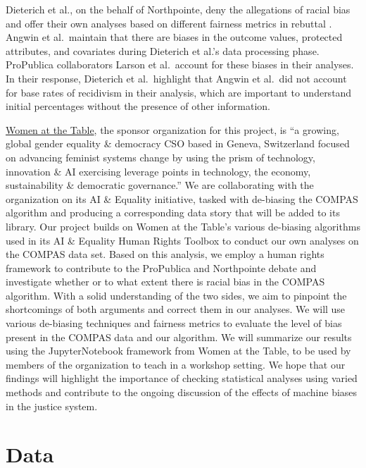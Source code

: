 \documentclass[water,article,submit,moreauthors,pdftex]{mdpi}
\begin{document}
Dieterich et al., on the behalf of Northpointe, deny the allegations of
racial bias and offer their own analyses based on different fairness
metrics in rebuttal \citep{equivant_response_2016}. Angwin et
al.~maintain that there are biases in the outcome values, protected
attributes, and covariates during Dieterich et al.'s data processing
phase. ProPublica collaborators Larson et al.~account for these biases
in their analyses. In their response, Dieterich et al.~highlight that
Angwin et al.~did not account for base rates of recidivism in their
analysis, which are important to understand initial percentages without
the presence of other information.

\href{https://www.womenatthetable.net/}{Women at the Table}, the sponsor
organization for this project, is ``a growing, global gender equality \&
democracy CSO based in Geneva, Switzerland focused on advancing feminist
systems change by using the prism of technology, innovation \& AI
exercising leverage points in technology, the economy, sustainability \&
democratic governance.'' We are collaborating with the organization on
its AI \& Equality \citep{noauthor_ai_nodate} initiative, tasked with
de-biasing the COMPAS algorithm \citep{aif360-oct-2018} and producing a
corresponding data story that will be added to its library. Our project
builds on Women at the Table's various de-biasing algorithms used in its
AI \& Equality Human Rights Toolbox to conduct our own analyses on the
COMPAS data set. Based on this analysis, we employ a human rights
framework to contribute to the ProPublica and Northpointe debate and
investigate whether or to what extent there is racial bias in the COMPAS
algorithm. With a solid understanding of the two sides, we aim to
pinpoint the shortcomings of both arguments and correct them in our
analyses. We will use various de-biasing techniques and fairness metrics
to evaluate the level of bias present in the COMPAS data and our
algorithm. We will summarize our results using the JupyterNotebook
framework from Women at the Table, to be used by members of the
organization to teach in a workshop setting. We hope that our findings
will highlight the importance of checking statistical analyses using
varied methods and contribute to the ongoing discussion of the effects
of machine biases in the justice system.

\hypertarget{data}{%
\section{Data}\label{data}}
\end{document}
